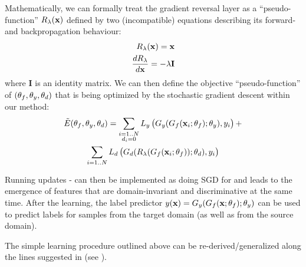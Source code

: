 Mathematically, we can formally treat the gradient reversal layer as a ``pseudo-function'' $R_\lambda({\mathbf x})$ defined by two (incompatible) equations describing its forward- and backpropagation behaviour:
\begin{align}
R_\lambda({\mathbf x}) = {\mathbf x}\\
\frac{dR_\lambda}{d{\mathbf x}} = -\lambda \mathbf{I}
\end{align}
where $\mathbf{I}$ is an identity matrix.
We can then define the objective ``pseudo-function'' of $({\theta_f},{\theta_y},{\theta_d})$ that is being optimized by the stochastic gradient descent within our method:
\begin{gather}
\tilde E({\theta_f},{\theta_y},{\theta_d}) =  \sum_{\substack{i=1..N\\d_i = 0}} L_y\left( \strut G_y(G_f({\mathbf x}_i;{\theta_f});{\theta_y}), y_i\right) +\nonumber\\ \sum_{i=1..N} L_d \left( \strut G_d(R_\lambda(G_f({\mathbf x}_i;{\theta_f}));{\theta_d}), y_i\right) \label{eq:pseudoobj}
\end{gather}

Running updates - can then be implemented as doing SGD for  and leads to the emergence of features that are domain-invariant and discriminative at the same time. After the learning, the label predictor $y({\mathbf x}) = G_y(G_f({\mathbf x};{\theta_f});{\theta_y})$ can be used to predict labels for samples from the target domain (as well as from the source domain).

The simple learning procedure outlined above can be re-derived/generalized along the lines suggested in \cite{Goodfellow14} (see \cite{SuppMat}).


